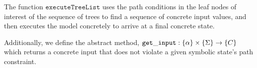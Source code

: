 The function $\mathtt{executeTreeList}$ uses the
    path conditions in the leaf nodes of interest of the sequence of trees to find a
    sequence of concrete input values, and then executes the model concretely to
    arrive at a final concrete state.

Additionally, we define the abstract method, $ \mathtt{get\_input} : \{\alpha\} \times \{\Sigma\} \rightarrow \{C\}$ which returns a concrete input that does not violate a given symbolic state's path constraint.





